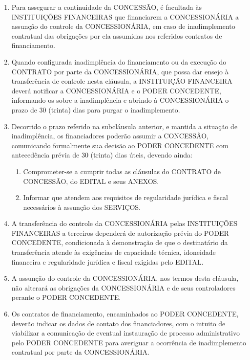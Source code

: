 \documentclass[a4paper,11pt]{report} %
\begin{document}
\begin{enumerate}
\item \label{itm:72PY}	Para assegurar a continuidade da CONCESSÃO, é facultada às INSTITUIÇÕES FINANCEIRAS que financiarem a CONCESSIONÁRIA a assunção do controle da CONCESSIONÁRIA, em caso de inadimplemento contratual das obrigações por ela assumidas nos referidos contratos de financiamento.  

\item \label{itm:NRVD}	Quando configurada inadimplência do financiamento ou da execução do CONTRATO por parte da CONCESSIONÁRIA, que possa dar ensejo à transferência de controle nesta cláusula, a INSTITUIÇÃO FINANCEIRA deverá notificar a CONCESSIONÁRIA e o PODER CONCEDENTE, informando-os sobre a inadimplência e abrindo à CONCESSIONÁRIA o prazo de 30 (trinta) dias para purgar o inadimplemento.

\item \label{itm:6VEL}	Decorrido o prazo referido na subcláusula anterior, e mantida a situação de inadimplência, os financiadores poderão assumir a CONCESSÃO, comunicando formalmente sua decisão ao PODER CONCEDENTE com antecedência prévia de 30 (trinta) dias úteis, devendo ainda:

\begin{enumerate}[label*=\arabic*.]
\item \label{itm:J5CB}	Comprometer-se a cumprir todas as cláusulas do CONTRATO de CONCESSÃO, do EDITAL e seus ANEXOS.

\item \label{itm:55F6}	Informar que atendem aos requisitos de regularidade jurídica e fiscal necessários à assunção dos SERVIÇOS.
\end{enumerate}

\item \label{itm:BAWY}	A transferência do controle da CONCESSIONÁRIA pelas INSTITUIÇÕES FINANCEIRAS a terceiros dependerá de autorização prévia do PODER CONCEDENTE, condicionada à demonstração de que o destinatário da transferência atende às exigências de capacidade técnica, idoneidade financeira e regularidade jurídica e fiscal exigidas pelo EDITAL.

\item \label{itm:Y2AS}	A assunção do controle da CONCESSIONÁRIA, nos termos desta cláusula, não alterará as obrigações da CONCESSIONÁRIA e de seus controladores perante o PODER CONCEDENTE.

\item \label{itm:83QD}	Os contratos de financiamento, encaminhados ao PODER CONCEDENTE, deverão indicar os dados de contato dos financiadores, com o intuito de viabilizar a comunicação de eventual instauração de processo administrativo pelo PODER CONCEDENTE para averiguar a ocorrência de inadimplemento contratual por parte da CONCESSIONÁRIA.
\end{enumerate}
\end{document}
